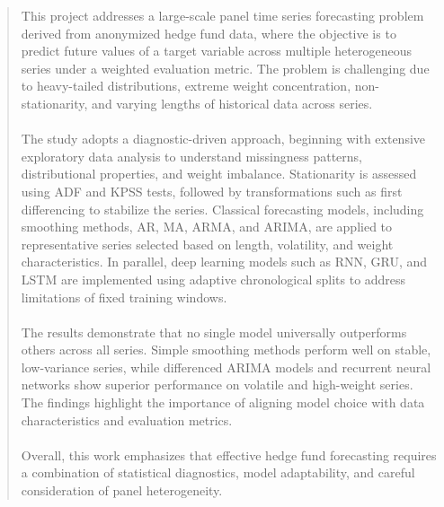 \documentclass[11pt]{article}
\begin{document}
\begin{abstract}
This project addresses a large-scale panel time series forecasting problem derived from anonymized hedge fund data, where the objective is to predict future values of a target variable across multiple heterogeneous series under a weighted evaluation metric. The problem is challenging due to heavy-tailed distributions, extreme weight concentration, non-stationarity, and varying lengths of historical data across series.
\\
\\
The study adopts a diagnostic-driven approach, beginning with extensive exploratory data analysis to understand missingness patterns, distributional properties, and weight imbalance. Stationarity is assessed using ADF and KPSS tests, followed by transformations such as first differencing to stabilize the series. Classical forecasting models, including smoothing methods, AR, MA, ARMA, and ARIMA, are applied to representative series selected based on length, volatility, and weight characteristics. In parallel, deep learning models such as RNN, GRU, and LSTM are implemented using adaptive chronological splits to address limitations of fixed training windows.
\\
\\
The results demonstrate that no single model universally outperforms others across all series. Simple smoothing methods perform well on stable, low-variance series, while differenced ARIMA models and recurrent neural networks show superior performance on volatile and high-weight series. The findings highlight the importance of aligning model choice with data characteristics and evaluation metrics.
\\
\\
Overall, this work emphasizes that effective hedge fund forecasting requires a combination of statistical diagnostics, model adaptability, and careful consideration of panel heterogeneity.
\end{abstract}

\clearpage
\tableofcontents













\end{document}
